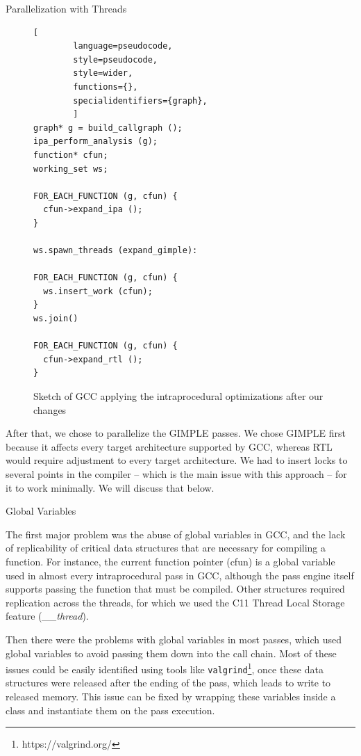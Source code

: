 \begin{section}{Parallelization with Threads}
\begin{figure}[ht]
	\begin{center}
	\begin{lstlisting}[
		language=pseudocode,
		style=pseudocode,
		style=wider,
		functions={},
		specialidentifiers={graph},
		]
graph* g = build_callgraph ();
ipa_perform_analysis (g);
function* cfun;
working_set ws;

FOR_EACH_FUNCTION (g, cfun) {
  cfun->expand_ipa ();
}

ws.spawn_threads (expand_gimple):

FOR_EACH_FUNCTION (g, cfun) {
  ws.insert_work (cfun);
}
ws.join()

FOR_EACH_FUNCTION (g, cfun) {
  cfun->expand_rtl ();
}
	\end{lstlisting}
	\end{center}
\caption{Sketch of GCC applying the intraprocedural optimizations after our changes}
\label{fig:intraprocedural_sketch_after}
\end{figure}

After that, we chose to parallelize the GIMPLE passes. We chose GIMPLE first
because it affects every target architecture supported by GCC, whereas RTL
would require adjustment to every target architecture.  We had to insert locks
to several points in the compiler – which is the main issue with this approach
– for it to work minimally. We will discuss that below.

\begin{subsection}{Global Variables}

The first major problem was the abuse of global variables in GCC, and the lack
of replicability of critical data structures that are necessary for compiling a
function. For instance, the current function pointer (cfun) is a global
variable used in almost every intraprocedural pass in GCC, although the pass
engine itself supports passing the function that must be compiled. Other
structures required replication across the threads, for which we used the C11
Thread Local Storage feature (\textit{\_\_thread}).

Then there were the problems with global variables in most passes, which used
global variables to avoid passing them down into the call chain. Most of these
issues could be easily identified using tools like
\texttt{valgrind}\footnote{https://valgrind.org/}, once these data structures
were released after the ending of the pass, which leads to write to released memory.
This issue can be fixed by wrapping these variables inside a class and
instantiate them on the pass execution.


\end{subsection}
\end{section}
